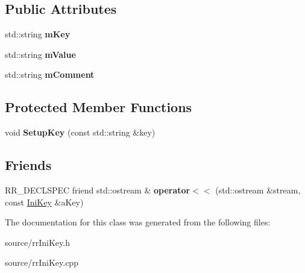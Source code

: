 \subsection*{Public Attributes}
\begin{DoxyCompactItemize}
\item 
\hypertarget{classrr_1_1_ini_key_a2b6ad34ba2064b6e0b199db842eeef1e}{std\-::string {\bfseries m\-Key}}\label{classrr_1_1_ini_key_a2b6ad34ba2064b6e0b199db842eeef1e}

\item 
\hypertarget{classrr_1_1_ini_key_ad57997d78fa52ffa6f80b4b38cbbdca2}{std\-::string {\bfseries m\-Value}}\label{classrr_1_1_ini_key_ad57997d78fa52ffa6f80b4b38cbbdca2}

\item 
\hypertarget{classrr_1_1_ini_key_a05f32ad89b647fbcd741d6efde1fbf57}{std\-::string {\bfseries m\-Comment}}\label{classrr_1_1_ini_key_a05f32ad89b647fbcd741d6efde1fbf57}

\end{DoxyCompactItemize}
\subsection*{Protected Member Functions}
\begin{DoxyCompactItemize}
\item 
\hypertarget{classrr_1_1_ini_key_a919b2236fd0b848a6937e87790a42a21}{void {\bfseries Setup\-Key} (const std\-::string \&key)}\label{classrr_1_1_ini_key_a919b2236fd0b848a6937e87790a42a21}

\end{DoxyCompactItemize}
\subsection*{Friends}
\begin{DoxyCompactItemize}
\item 
\hypertarget{classrr_1_1_ini_key_a06c09c9a71baa77d29b3cfaf5598553a}{R\-R\-\_\-\-D\-E\-C\-L\-S\-P\-E\-C friend std\-::ostream \& {\bfseries operator$<$$<$} (std\-::ostream \&stream, const \hyperlink{classrr_1_1_ini_key}{Ini\-Key} \&a\-Key)}\label{classrr_1_1_ini_key_a06c09c9a71baa77d29b3cfaf5598553a}

\end{DoxyCompactItemize}


The documentation for this class was generated from the following files\-:\begin{DoxyCompactItemize}
\item 
source/rr\-Ini\-Key.\-h\item 
source/rr\-Ini\-Key.\-cpp\end{DoxyCompactItemize}
